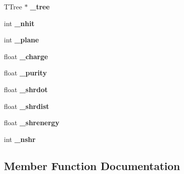 \begin{DoxyCompactItemize}
\item 
T\+Tree $\ast$ {\bfseries \+\_\+tree}\hypertarget{classSecondShowerPurity_acc6a1cb74b439825c0c3e116e7e79990}{}\label{classSecondShowerPurity_acc6a1cb74b439825c0c3e116e7e79990}

\item 
int {\bfseries \+\_\+nhit}\hypertarget{classSecondShowerPurity_a4b4ced7189ab5da87a01efbf5efab94f}{}\label{classSecondShowerPurity_a4b4ced7189ab5da87a01efbf5efab94f}

\item 
int {\bfseries \+\_\+plane}\hypertarget{classSecondShowerPurity_a46cb720b340572ad480511628fe77e89}{}\label{classSecondShowerPurity_a46cb720b340572ad480511628fe77e89}

\item 
float {\bfseries \+\_\+charge}\hypertarget{classSecondShowerPurity_a5bfedf045c3c104e60b2173ccb1d1338}{}\label{classSecondShowerPurity_a5bfedf045c3c104e60b2173ccb1d1338}

\item 
float {\bfseries \+\_\+purity}\hypertarget{classSecondShowerPurity_a96749b5f8597709f571d396df397c09e}{}\label{classSecondShowerPurity_a96749b5f8597709f571d396df397c09e}

\item 
float {\bfseries \+\_\+shrdot}\hypertarget{classSecondShowerPurity_ac760b87c66bded961e5af29ea7cc3b64}{}\label{classSecondShowerPurity_ac760b87c66bded961e5af29ea7cc3b64}

\item 
float {\bfseries \+\_\+shrdist}\hypertarget{classSecondShowerPurity_a5191904da66cd252ac24707a5bfdba35}{}\label{classSecondShowerPurity_a5191904da66cd252ac24707a5bfdba35}

\item 
float {\bfseries \+\_\+shrenergy}\hypertarget{classSecondShowerPurity_a7247d04b7d470db3a7f0c65084187976}{}\label{classSecondShowerPurity_a7247d04b7d470db3a7f0c65084187976}

\item 
int {\bfseries \+\_\+nshr}\hypertarget{classSecondShowerPurity_a0031191dddf516922b44958d3b32d54c}{}\label{classSecondShowerPurity_a0031191dddf516922b44958d3b32d54c}

\end{DoxyCompactItemize}


\subsection{Member Function Documentation}
